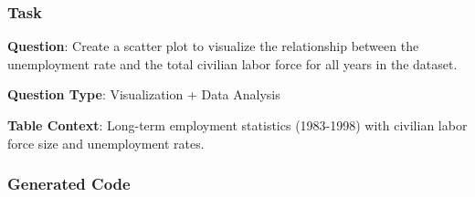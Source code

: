 \subsubsection{Task}

\textbf{Question}: Create a scatter plot to visualize the relationship between the unemployment rate and the total civilian labor force for all years in the dataset.

\textbf{Question Type}: Visualization + Data Analysis

\textbf{Table Context}: Long-term employment statistics (1983-1998) with civilian labor force size and unemployment rates.

\subsubsection{Generated Code}

